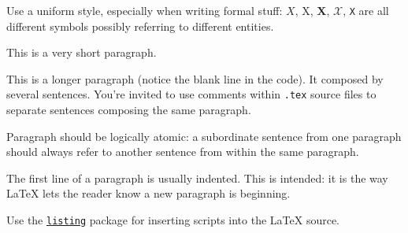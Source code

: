 \documentclass{scrartcl}
\begin{document}
Use a uniform style, especially when writing formal stuff: $X$, X, $\mathbf{X}$, $\mathcal{X}$, \texttt{X} are all different symbols possibly referring to different entities.

This is a very short paragraph.

This is a longer paragraph (notice the blank line in the code).
It composed by several sentences.
%
You're invited to use comments within \texttt{.tex} source files to separate sentences composing the same paragraph.

Paragraph should be logically atomic: a subordinate sentence from one paragraph should always refer to another sentence from within the same paragraph.

The first line of a paragraph is usually indented.
%
This is intended: it is the way \LaTeX{} lets the reader know a new paragraph is beginning.

Use the \href{https://en.wikibooks.org/wiki/LaTeX/Source_Code_Listings}{\texttt{listing}} package for inserting scripts into the \LaTeX{} source.

\nocite{*} %


\end{document}
